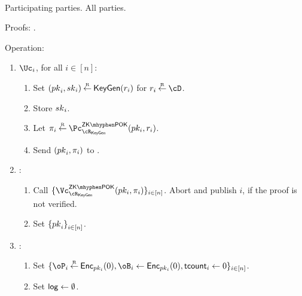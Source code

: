 \begin{protocol}~\label{prot:ConfidentialTransactions:Init}
	

	\item[Participating parties.] All parties.
			
			
	\item[Proofs:]   \piZKPOK{\rKeyGen}. 
	
	
	
			
\item[Operation:] ~
			
			
			\begin{enumerate}
				
				\item   $\Uc_i$, for  all $i\in [n]$:
				\begin{enumerate}
					\item Set $({pk}_i,{sk}_i) \mathbin{\stackrel{\mbox{\tiny R}}{\leftarrow}} \mathsf{KeyGen}(r_i)$ for $r_i \getsr \cD$.
					
					\item Store ${sk}_i$.
					
					\item Let $\pi_i \getsr \pZKPOK{\rKeyGen}(pk_i,r_i)$.
					
					\item Send $({pk}_i,\pi_i)$ to \Cc.
					
					
				\end{enumerate}
				
				\item \Cc:
				\begin{enumerate}
					
					\item Call $\sset{ \vZKPOK{\rKeyGen}(pk_i,\pi_i)}_{i\in [n]}$. Abort and publish $i$, if the \ith  proof is not verified. 
										
					\item Set $\set{\pk_i}_{i\in [n]}$.
				\end{enumerate}
				
				
				\item \Cc: 
				\begin{enumerate}
					\item 	Set $\sset{\oP_i\getsr \Enc_{pk_i}(0),\oB_i\asn \Enc_{pk_i}(0),\tcount_i 
					\asn 0}_{i\in [n]}$.
					
					\item    Set $\mathsf{log} \leftarrow \emptyset$.
				\end{enumerate}								
			\end{enumerate}
\end{protocol}


